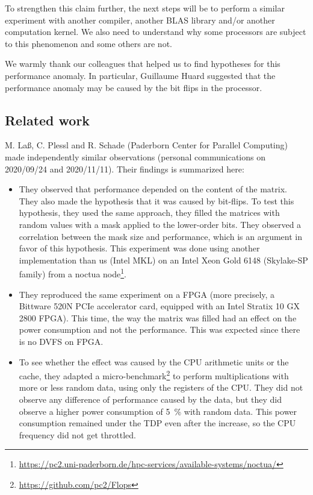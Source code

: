             To strengthen this claim further, the next steps will be to perform a similar experiment with another
            compiler, another BLAS library and/or another computation kernel. We also need to understand why some
            processors are subject to this phenomenon and some others are not.

            We warmly thank our colleagues that helped us to find hypotheses for this performance anomaly. In
            particular, Guillaume Huard suggested that the performance anomaly may be caused by the bit flips in the
            processor.

        \subsection{Related work}%
            M. La{\ss}, C. Plessl and R. Schade (Paderborn Center for Parallel Computing) made independently similar
            observations (personal communications on 2020/09/24 and 2020/11/11). Their findings is summarized here:
            \begin{itemize}
                \item They observed that \dgemm performance depended on the content of the matrix. They also
                    made the hypothesis that it was caused by bit-flips. To test this hypothesis, they used the same
                    approach, they filled the matrices with random values with a mask applied to the lower-order bits.
                    They observed a correlation between the mask size and \dgemm performance, which is an
                    argument in favor of this hypothesis. This experiment was done using another \dgemm
                    implementation than us (Intel MKL) on an Intel Xeon Gold 6148 (Skylake-SP family) from a noctua
                    node\footnote{\url{https://pc2.uni-paderborn.de/hpc-services/available-systems/noctua/}}.
                \item They reproduced the same experiment on a FPGA (more precisely, a Bittware 520N PCIe accelerator
                    card, equipped with an Intel Stratix 10 GX 2800 FPGA). This time, the way the matrix was filled had
                    an effect on the power consumption and not the performance. This was expected since there is no DVFS
                    on FPGA.
                \item To see whether the effect was caused by the CPU arithmetic units or the cache, they adapted a
                    micro-benchmark\footnote{\url{https://github.com/pc2/Flops}} to perform multiplications with more or
                    less random data, using only the registers of the CPU. They did not observe any difference of
                    performance caused by the data, but they did observe a higher power consumption of \SI{5}{\percent}
                    with random data. This power consumption remained under the TDP even after the increase, so the CPU
                    frequency did not get throttled.
            \end{itemize}

